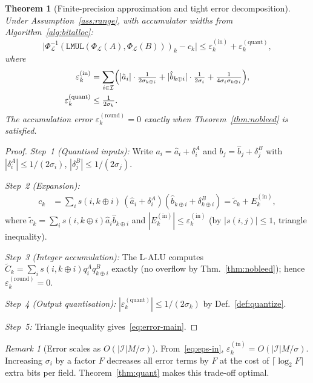 \documentclass[11pt,a4paper]{article}
\theoremstyle{definition}
\theoremstyle{plain}
\newtheorem{theorem}{Theorem}[section]
\theoremstyle{remark}
\newtheorem{remark}{Remark}[section]
\newcommand{\Pack}{\Phi_{\mathcal{L}}}
\newcommand{\Unpack}{\Phi^{-1}_{\mathcal{L}}}
\begin{document}
\begin{theorem}[Finite-precision approximation and tight error decomposition]
\label{thm:finite-approx}
Under Assumption~\ref{ass:range}, with accumulator widths from
Algorithm~\ref{alg:bitalloc}:
\begin{equation}\label{eq:error-main}
  \bigl|\Unpack(\mathtt{LMUL}(\Pack(A),\Pack(B)))_k - c_k\bigr|
  \le \varepsilon_k^{(\mathrm{in})} + \varepsilon_k^{(\mathrm{quant})},
\end{equation}
where
\begin{align}
  \varepsilon_k^{(\mathrm{in})}
    &= \sum_{i\in\mathcal{I}}
      \Bigl(|\hat{a}_i|\cdot\tfrac{1}{2\sigma_{k\oplus i}}
        + |\hat{b}_{k\oplus i}|\cdot\tfrac{1}{2\sigma_i}
        + \tfrac{1}{4\sigma_i\sigma_{k\oplus i}}\Bigr),
      \label{eq:eps-in}\\
  \varepsilon_k^{(\mathrm{quant})}
    &\le \tfrac{1}{2\sigma_k}.
      \label{eq:eps-quant}
\end{align}
The accumulation error $\varepsilon_k^{(\mathrm{round})}=0$
exactly when Theorem~\ref{thm:nobleed} is satisfied.
\end{theorem}
\begin{proof}
\textit{Step~1 (Quantised inputs):}
Write $a_i = \hat{a}_i + \delta_i^A$ and
$b_j = \hat{b}_j + \delta_j^B$ with
$|\delta_i^A|\le 1/(2\sigma_i)$, $|\delta_j^B|\le 1/(2\sigma_j)$.

\textit{Step~2 (Expansion):}
\begin{align}
  c_k
  &= \sum_{i} s(i,k\oplus i)\,(\hat{a}_i+\delta_i^A)(\hat{b}_{k\oplus i}+\delta_{k\oplus i}^B)
  = \tilde{c}_k + E_k^{(\mathrm{in})},
\end{align}
where $\tilde{c}_k = \sum_i s(i,k\oplus i)\hat{a}_i\hat{b}_{k\oplus i}$
and $|E_k^{(\mathrm{in})}|\le\varepsilon_k^{(\mathrm{in})}$
(by $|s(i,j)|\le 1$, triangle inequality).

\textit{Step~3 (Integer accumulation):}
The L-ALU computes $\tilde{C}_k = \sum_i s(i,k\oplus i)q_i^Aq_{k\oplus i}^B$
exactly (no overflow by Thm.~\ref{thm:nobleed});
hence $\varepsilon_k^{(\mathrm{round})}=0$.

\textit{Step~4 (Output quantisation):}
$|\varepsilon_k^{(\mathrm{quant})}|\le 1/(2\sigma_k)$ by Def.~\ref{def:quantize}.

\textit{Step~5:} Triangle inequality gives~\eqref{eq:error-main}.
\end{proof}

\begin{remark}[Error scales as $O(|\mathcal{I}|M/\sigma)$]
From~\eqref{eq:eps-in},
$\varepsilon_k^{(\mathrm{in})} = O(|\mathcal{I}|M/\sigma)$.
Increasing $\sigma_i$ by a factor $F$ decreases all error terms by $F$
at the cost of $\lceil\log_2 F\rceil$ extra bits per field.
Theorem~\ref{thm:quant} makes this trade-off optimal.
\end{remark}
\end{document}
